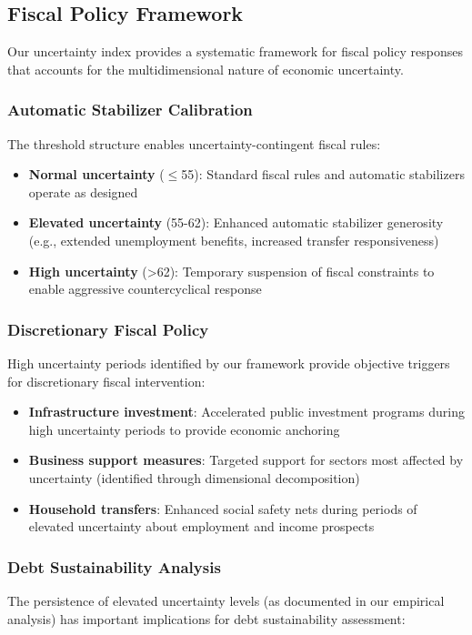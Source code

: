 \documentclass[5p,authoryear]{elsarticle}
\begin{document}
\subsection{Fiscal Policy Framework}

Our uncertainty index provides a systematic framework for fiscal policy responses that accounts for the multidimensional nature of economic uncertainty.

\subsubsection{Automatic Stabilizer Calibration}
The threshold structure enables uncertainty-contingent fiscal rules:

\begin{itemize}
    \item \textbf{Normal uncertainty} ($\leq$55): Standard fiscal rules and automatic stabilizers operate as designed
    \item \textbf{Elevated uncertainty} (55-62): Enhanced automatic stabilizer generosity (e.g., extended unemployment benefits, increased transfer responsiveness)
    \item \textbf{High uncertainty} (>62): Temporary suspension of fiscal constraints to enable aggressive countercyclical response
\end{itemize}

\subsubsection{Discretionary Fiscal Policy}
High uncertainty periods identified by our framework provide objective triggers for discretionary fiscal intervention:

\begin{itemize}
    \item \textbf{Infrastructure investment}: Accelerated public investment programs during high uncertainty periods to provide economic anchoring
    \item \textbf{Business support measures}: Targeted support for sectors most affected by uncertainty (identified through dimensional decomposition)
    \item \textbf{Household transfers}: Enhanced social safety nets during periods of elevated uncertainty about employment and income prospects
\end{itemize}

\subsubsection{Debt Sustainability Analysis}
The persistence of elevated uncertainty levels (as documented in our empirical analysis) has important implications for debt sustainability assessment:
\end{document}
